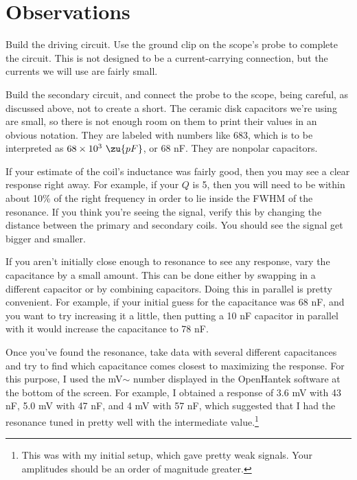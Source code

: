 \section*{Observations}


Build the driving circuit. 
Use the ground clip on the scope's probe to complete the circuit.
This is not designed to be a current-carrying connection, but the
currents we will use are fairly small.

Build the secondary circuit, and connect the probe to the scope,
being careful, as discussed above, not to create a short. The ceramic
disk capacitors we're using are small, so there is not enough room
on them to print their values in an obvious notation. They are labeled
with numbers like 683, which is to be interpreted as $68\times10^3\ \zu{pF}$,
or 68 nF. They are nonpolar capacitors.

If your estimate of the coil's inductance was fairly good, then you
may see a clear response right away. For example,
if your $Q$ is 5, then you will need to be within about 10\% of
the right frequency in order to lie inside the FWHM of the resonance.
If you think you're seeing the signal, verify this 
by changing the distance between the primary and
secondary coils. You should see the signal get bigger and smaller.

If you aren't initially close enough to resonance
to see any response, vary the capacitance by a small amount. This
can be done either by swapping in a different capacitor or by
combining capacitors. Doing this in parallel
is pretty convenient. For example, if your initial guess for the
capacitance was 68 nF, and you want to try increasing it a little,
then putting a 10 nF capacitor in parallel with it would increase
the capacitance to 78 nF.

Once you've found the resonance, take data with several different
capacitances and try to find which capacitance comes closest to
maximizing the response. For this purpose, I used the mV$\sim$ number
displayed in the OpenHantek software at the bottom of the screen.
For example, I obtained a response of 3.6 mV with 43 nF,
5.0 mV with 47 nF, and 4 mV with 57 nF, which suggested that I
had the resonance tuned in pretty well with the intermediate
value.\footnote{This was with my initial setup, which gave pretty weak
signals. Your amplitudes should be an order of magnitude greater.}


